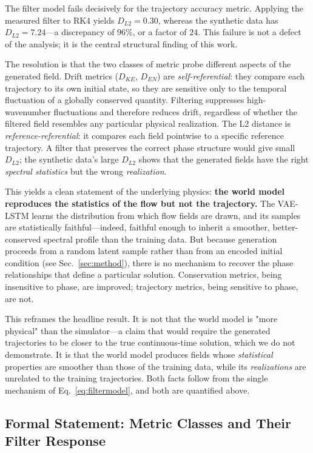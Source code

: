 \documentclass[reprint,aps,pre]{revtex4-2}
\begin{document}
The filter model fails decisively for the trajectory accuracy metric. Applying the measured filter to RK4 yields $D_{L2} = 0.30$, whereas the synthetic data has $D_{L2} = 7.24$---a discrepancy of $96\%$, or a factor of $24$. This failure is not a defect of the analysis; it is the central structural finding of this work.

The resolution is that the two classes of metric probe different aspects of the generated field. Drift metrics ($D_{KE}$, $D_{EN}$) are \textit{self-referential}: they compare each trajectory to its own initial state, so they are sensitive only to the temporal fluctuation of a globally conserved quantity. Filtering suppresses high-wavenumber fluctuations and therefore reduces drift, regardless of whether the filtered field resembles any particular physical realization. The L2 distance is \textit{reference-referential}: it compares each field pointwise to a specific reference trajectory. A filter that preserves the correct phase structure would give small $D_{L2}$; the synthetic data's large $D_{L2}$ shows that the generated fields have the right \textit{spectral statistics} but the wrong \textit{realization}.

This yields a clean statement of the underlying physics: \textbf{the world model reproduces the statistics of the flow but not the trajectory.} The VAE-LSTM learns the distribution from which flow fields are drawn, and its samples are statistically faithful---indeed, faithful enough to inherit a smoother, better-conserved spectral profile than the training data. But because generation proceeds from a random latent sample rather than from an encoded initial condition (see Sec.~\ref{sec:method}), there is no mechanism to recover the phase relationships that define a particular solution. Conservation metrics, being insensitive to phase, are improved; trajectory metrics, being sensitive to phase, are not.

This reframes the headline result. It is not that the world model is "more physical" than the simulator---a claim that would require the generated trajectories to be closer to the true continuous-time solution, which we do not demonstrate. It is that the world model produces fields whose \textit{statistical} properties are smoother than those of the training data, while its \textit{realizations} are unrelated to the training trajectories. Both facts follow from the single mechanism of Eq.~\eqref{eq:filtermodel}, and both are quantified above.

\subsection{Formal Statement: Metric Classes and Their Filter Response}
\end{document}
